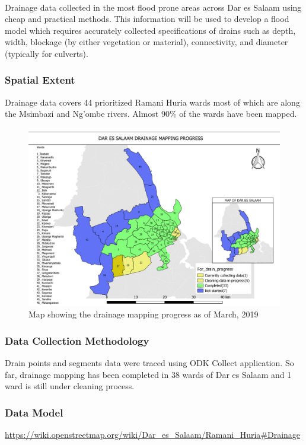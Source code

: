 \documentclass[a4paper,12pt,twoside]{article}
\begin{document}
\

Drainage data collected in the most flood prone areas across Dar es Salaam using cheap  and practical methods. This information will be used to develop a flood model which requires accurately collected specifications of drains such as depth, width, blockage (by either vegetation or material), connectivity, and diameter (typically for culverts).

\subsubsection{Spatial Extent}
Drainage data covers 44 prioritized Ramani Huria wards most of which are along the Msimbazi and Ng’ombe rivers. Almost 90\% of the wards have been mapped.

\begin{figure}[h]
  \color{RHgreen}\caption{Map showing the drainage mapping progress as of March, 2019}
  \centering
  \includegraphics[width=1\textwidth]{images/Dar_drainage_mapping_progress.png}
\end{figure}

\subsubsection{Data Collection Methodology}

Drain points and segments data were traced using ODK Collect application. So far, drainage mapping has been completed in 38 wards of Dar es Salaam and 1 ward is still under cleaning process.

\subsubsection{Data Model}
\href{https://wiki.openstreetmap.org/wiki/Dar_es_Salaam/Ramani_Huria\#Drainage}{https://wiki.openstreetmap.org/wiki/Dar\_es\_Salaam/Ramani_Huria\#Drainage}
\end{document}
